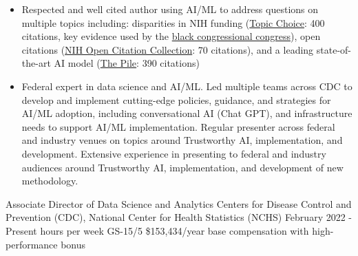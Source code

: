 \documentclass[]{scrartcl}
\begin{document}
\begin{cleanCV}

   \vspace{-1em}

   {
  \vspace{-0.25em}
  \begin{itemize}

      \item Respected and well cited author using AI/ML to address questions on multiple topics including: disparities in NIH funding (\href{https://www.science.org/doi/10.1126/sciadv.aaw7238}{Topic Choice}: 400 citations, key evidence used by the \href{https://bluntrochester.house.gov/uploadedfiles/191220_ltr_to_nih_about_grant_disparities.pdf}{black congressional congress}), open citations (\href{https://www.ncbi.nlm.nih.gov/pmc/articles/PMC6786512/}{NIH Open Citation Collection}: 70 citations), and a leading state-of-the-art AI model (\href{https://arxiv.org/abs/2101.00027}{The Pile}: 390 citations)

      \item Federal expert in data science and AI/ML. Led multiple teams across CDC to develop and implement cutting-edge policies, guidance, and strategies for AI/ML adoption, including conversational AI (Chat GPT), and infrastructure needs to support AI/ML implementation. Regular presenter across federal and industry venues on topics around Trustworthy AI, implementation, and development. Extensive experience in presenting to federal and industry audiences around Trustworthy AI, implementation, and development of new methodology.

  \end{itemize}
}


  \vspace{-1em}

\WorkExperience
{}
{Associate Director of Data Science and Analytics}
{
  \newline Centers for Disease Control and Prevention (CDC), National Center for Health Statistics (NCHS)
  \newline February 2022 - Present
   hours per week
  \newline GS-15/5 \$153,434/year base compensation with high-performance bonus 
}
{
  \vspace{-0.25em}
  \begin{itemize}


\end{itemize}}
\end{cleanCV}
\end{document}

